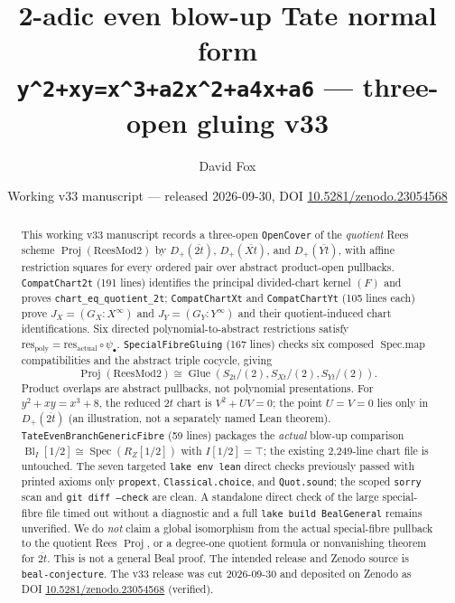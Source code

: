 \documentclass[11pt]{article}
\title{2-adic even blow-up Tate normal form\\
\texttt{y\textasciicircum2+xy=x\textasciicircum3+a2x\textasciicircum2+a4x+a6}
--- three-open gluing v33}
\author{David Fox}
\date{Working v33 manuscript --- released 2026-09-30,
DOI \href{https://doi.org/10.5281/zenodo.23054568}{10.5281/zenodo.23054568}}
\begin{document}
\maketitle

\begin{abstract}
This working v33 manuscript records a three-open \texttt{OpenCover} of the
\emph{quotient} Rees scheme $\operatorname{Proj}(\mathrm{ReesMod2})$ by
$D_+(\overline{2t})$, $D_+(\overline{Xt})$, and $D_+(\overline{Yt})$,
with affine restriction squares for every ordered pair over abstract
product-open pullbacks. \texttt{CompatChart2t} (191 lines) identifies the
principal divided-chart kernel $(F)$ and proves
\texttt{chart\_eq\_quotient\_2t};
\texttt{CompatChartXt} and \texttt{CompatChartYt} (105 lines each)
prove $J_X=(G_X:X^\infty)$ and $J_Y=(G_Y:Y^\infty)$ and their
quotient-induced chart identifications. Six directed polynomial-to-abstract
restrictions satisfy $\mathrm{res}_{\mathrm{poly}}
=\mathrm{res}_{\mathrm{actual}}\circ\psi_\bullet$.
\texttt{SpecialFibreGluing} (167 lines) checks six composed
$\operatorname{Spec.map}$ compatibilities and the abstract triple
cocycle, giving
\[
\operatorname{Proj}(\mathrm{ReesMod2})\cong
\operatorname{Glue}(S_{2t}/(2),S_{Xt}/(2),S_{Yt}/(2)).
\]
Product overlaps are abstract pullbacks, not polynomial presentations.
For $y^2+xy=x^3+8$, the reduced $2t$ chart is $V^2+UV=0$;
the point $U=V=0$ lies only in $D_+(\overline{2t})$ (an
illustration, not a separately named Lean theorem).
\texttt{TateEvenBranchGenericFibre} (59 lines) packages the
\emph{actual} blow-up comparison
$\operatorname{Bl}_I[1/2]\cong\operatorname{Spec}(R_Z[1/2])$
with $I[1/2]=\top$; the existing 2,249-line chart file is untouched.
The seven targeted \texttt{lake env lean} direct checks previously passed
with printed axioms only \texttt{propext}, \texttt{Classical.choice},
and \texttt{Quot.sound}; the scoped \texttt{sorry} scan and
\texttt{git diff --check} are clean. A standalone direct check of the
large special-fibre file timed out without a diagnostic and a full
\texttt{lake build BealGeneral} remains unverified. We do \emph{not}
claim a global isomorphism from the actual special-fibre pullback to
the quotient Rees $\operatorname{Proj}$, or a degree-one quotient
formula or nonvanishing theorem for $\overline{2t}$. This is not a
general Beal proof. The intended release and Zenodo source is
\texttt{beal-conjecture}. The v33 release was cut 2026-09-30 and
deposited on Zenodo as DOI
\href{https://doi.org/10.5281/zenodo.23054568}{10.5281/zenodo.23054568}
(verified).
\end{abstract}
\end{document}
